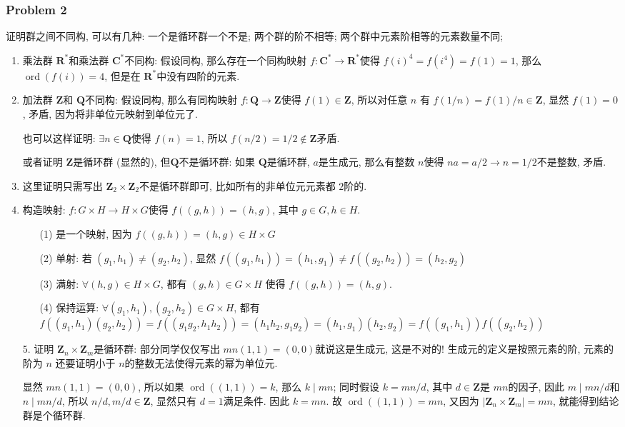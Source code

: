 \documentclass[a4paper,12pt]{ctexart}
\newcommand{\Z}{\mathbf{Z}}
\newcommand{\Com}{\mathbf{C}}
\newcommand{\ord}{\operatorname{ord}}
\newcommand{\Q}{\mathbf{Q}}
\newcommand{\R}{\mathbf{R}}
\begin{document}
\subsubsection*{Problem 2}
      证明群之间不同构, 可以有几种: 一个是循环群一个不是; 两个群的阶不相等; 两个群中元素阶相等的元素数量不同; 
    \begin{enumerate}
      \item 乘法群 $ \R^* $和乘法群 $ \Com^* $不同构: 假设同构, 那么存在一个同构映射
      $ f:\Com^*\rightarrow\R^* $使得 $ f(i)^4=f(i^4)=f(1)=1 $, 那么 $ \ord(f(i))=4 $, 但是在 $ \R^* $中没有四阶的元素.
      \item 加法群 $ \Z $和 $ \Q $不同构: 假设同构, 
      那么有同构映射 $ f:\Q\rightarrow\Z $使得 $ f(1)\in\Z $, 所以对任意 $ n $ 有 $ f(1/n)=f(1)/n\in\Z $, 显然 $ f(1)=0 $, 矛盾, 因为将非单位元映射到单位元了.

      也可以这样证明: $ \exists n\in\Q $使得 $ f(n)=1 $, 所以 $ f(n/2)=1/2\notin\Z $矛盾.

      或者证明 $ \Z $是循环群 (显然的), 但$ \Q $不是循环群: 如果 $ \Q $是循环群, $ a $是生成元, 那么有整数 $ n $使得 $ na=a/2\rightarrow n=1/2 $不是整数, 矛盾.
      \item 这里证明只需写出 $ \Z_2\times\Z_2 $不是循环群即可, 比如所有的非单位元元素都 $ 2 $阶的.
      \item 构造映射: $ f:G\times H\rightarrow H\times G $使得 $ f((g,h))=(h,g) $, 
      其中 $ g\in G,h\in H $.
      \begin{enumerate}
        \item[(1)]是一个映射, 因为 $ f((g,h))=(h,g)\in H\times G $
        \item[(2)]单射: 若 $ (g_1,h_1)\neq (g_2,h_2) $, 显然 $ f((g_1,h_1))=(h_1,g_1)\neq f((g_2,h_2))=(h_2,g_2) $
        \item[(3)]满射: $ \forall (h,g)\in H\times G $, 都有 $ (g,h)\in G\times H $ 使得 $ f((g,h))=(h,g) $.
        \item[(4)]保持运算: $ \forall (g_1,h_1),(g_2,h_2)\in G\times H $, 都有 $ f((g_1,h_1)(g_2,h_2))=f((g_1g_2,h_1h_2))=(h_1h_2,g_1g_2)=(h_1,g_1)(h_2,g_2)=f((g_1,h_1))f((g_2,h_2)) $ 
      \end{enumerate}
      \item[5.] 证明 $ \Z_n\times\Z_m $是循环群: 部分同学仅仅写出 $ mn(1,1)=(0,0) $就说这是生成元, 这是不对的!
      生成元的定义是按照元素的阶, 元素的阶为 $ n $ 还要证明小于 $ n $的整数无法使得元素的幂为单位元.
      
      显然 $ mn(1,1)=(0,0) $, 所以如果 $ \ord((1,1))=k $, 那么 $ k\mid mn $; 同时假设 $ k=mn/d $, 其中 $ d\in\Z $是 $ mn $的因子, 因此 $ m\mid mn/d $和 $ n\mid mn/d $, 所以 $ n/d,m/d\in\Z $, 显然只有 $ d=1 $满足条件. 因此 $ k=mn $. 故 $ \ord((1,1))=mn $, 又因为 $ |\Z_n\times\Z_m|=mn $, 就能得到结论 群是个循环群. 
    \end{enumerate}
\end{document}
